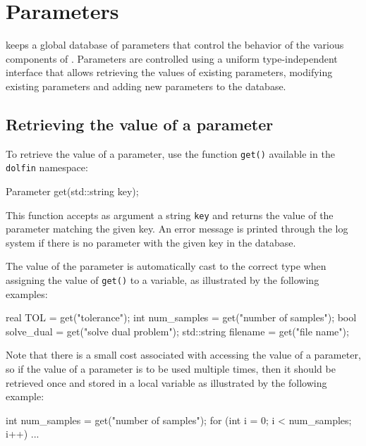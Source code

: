 \chapter{Parameters}
\label{sec:parameters}


\dolfin{} keeps a global database of parameters that control the
behavior of the various components of \dolfin{}. Parameters are
controlled using a uniform type-independent interface that allows
retrieving the values of existing parameters, modifying existing
parameters and adding new parameters to the database.

\section{Retrieving the value of a parameter}

To retrieve the value of a parameter, use the function \texttt{get()}
available in the \texttt{dolfin} namespace:
\begin{code}
Parameter get(std::string key);
\end{code}
This function accepts as argument a string \texttt{key} and returns
the value of the parameter matching the given key. An error message is
printed through the log system if there is no parameter with the given
key in the database.

The value of the parameter is automatically cast to the correct type
when assigning the value of \texttt{get()} to a variable, as
illustrated by the following examples:
\begin{code}
real TOL = get("tolerance");
int num_samples = get("number of samples");
bool solve_dual = get("solve dual problem");
std::string filename = get("file name");
\end{code}

Note that there is a small cost associated with accessing the value of
a parameter, so if the value of a parameter is to be used multiple
times, then it should be retrieved once and stored in a local variable
as illustrated by the following example:
\begin{code}
int num_samples = get("number of samples");
for (int i = 0; i < num_samples; i++)
{
  ...
}
\end{code}

